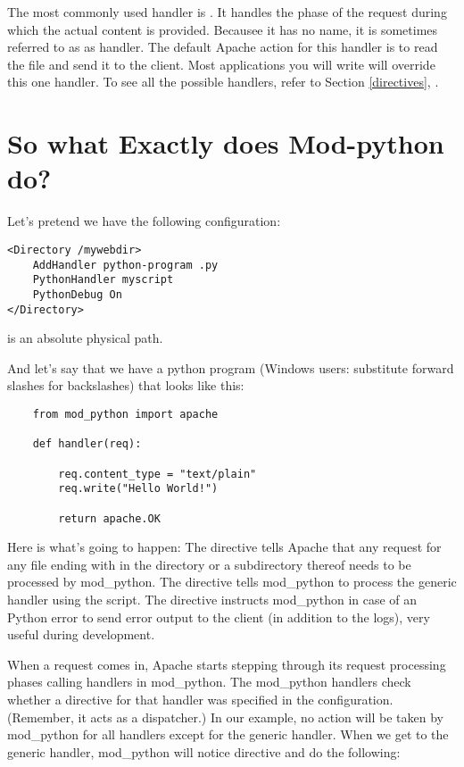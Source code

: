 The most commonly used handler is . It handles the
phase of the request during which the actual content is
provided. Becausee it has no name, it is sometimes referred to as as
 handler. The default Apache action for this handler is
to read the file and send it to the client. Most applications you will
write will override this one handler. To see all the possible
handlers, refer to Section \ref{directives},
.

\section{So what Exactly does Mod-python do?\label{tut-what-it-do}}

Let's pretend we have the following configuration: 
\begin{verbatim}
<Directory /mywebdir>
    AddHandler python-program .py
    PythonHandler myscript
    PythonDebug On
</Directory>
\end{verbatim}

  is an absolute physical path. 

And let's say that we have a python program (Windows users: substitute
forward slashes for backslashes)  that looks like
this:

\begin{verbatim}
    from mod_python import apache

    def handler(req):

        req.content_type = "text/plain"
        req.write("Hello World!")

        return apache.OK
\end{verbatim}    

Here is what's going to happen: The  directive tells
Apache that any request for any file ending with  in the
 directory or a subdirectory thereof needs to be
processed by mod_python. The  directive
tells mod_python to process the generic handler using the
 script. The  directive instructs
mod_python in case of an Python error to send error output to the
client (in addition to the logs), very useful during development.

When a request comes in, Apache starts stepping through its
request processing phases calling handlers in mod_python. The
mod_python handlers check whether a directive for that handler was
specified in the configuration. (Remember, it acts as a dispatcher.)
In our example, no action will be taken by mod_python for
all handlers except for the generic handler. When we get to the
generic handler, mod_python will notice  directive and do the following:

